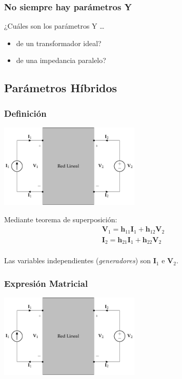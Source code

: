 \subsubsection{No siempre hay parámetros Y}
\label{sec:org4af051f}

¿Cuáles son los parámetros Y \ldots{} 

\begin{itemize}
\item de un transformador ideal?
\item de una impedancia paralelo?
\end{itemize}

\subsection{Parámetros Híbridos}
\label{sec:org7054e38}
\subsubsection{Definición}
\label{sec:orgafed8ae}
\begin{center}
\includegraphics[height=4cm]{../figs/cuadripolo_hibrido.pdf}
\end{center}

Mediante teorema de superposición:
\[
\begin{array}{l}
  \mathbf{V}_1 = \mathbf{h}_{11} \mathbf{I}_1 + \mathbf{h}_{12} \mathbf{V}_2\\
  \mathbf{I}_2 = \mathbf{h}_{21} \mathbf{I}_1 + \mathbf{h}_{22} \mathbf{V}_2\\
\end{array}
\]

Las variables independientes (\emph{generadores}) son \(\mathbf{I}_1\) e \(\mathbf{V}_2\).


\subsubsection{Expresión Matricial}
\label{sec:org249baea}
\begin{center}
\includegraphics[height=4cm]{../figs/cuadripolo_hibrido.pdf}
\end{center}

